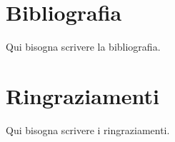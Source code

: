 \documentclass[10pt, twoside, openany]{book}
\begin{document}
\chapter*{Bibliografia}
Qui bisogna scrivere la bibliografia.

\chapter*{Ringraziamenti}
Qui bisogna scrivere i ringraziamenti.
\end{document}

